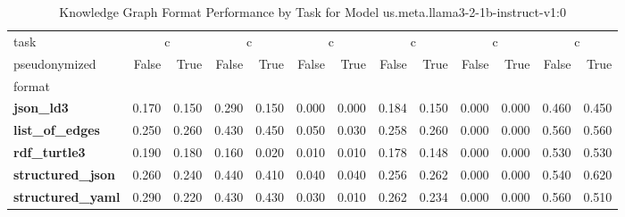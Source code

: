 \begin{table}
\caption{Knowledge Graph Format Performance by Task for Model us.meta.llama3-2-1b-instruct-v1:0}
\label{tab:results_us.meta.llama3-2-1b-instruct-v1:0}
\begin{tabular}{lrrrrrrrrrrrr}
\toprule
task & \multicolumn{2}{c}{c}{AggByRelation} & \multicolumn{2}{c}{c}{AggNeighborProperties} & \multicolumn{2}{c}{c}{HighestDegreeNode} & \multicolumn{2}{c}{c}{Overall} & \multicolumn{2}{c}{c}{ShortestPath} & \multicolumn{2}{c}{c}{TripleRetrieval} \\
pseudonymized & False & True & False & True & False & True & False & True & False & True & False & True \\
format &  &  &  &  &  &  &  &  &  &  &  &  \\
\midrule
\textbf{json_ld3} & 0.170 & 0.150 & 0.290 & 0.150 & 0.000 & 0.000 & 0.184 & 0.150 & 0.000 & 0.000 & 0.460 & 0.450 \\
\textbf{list_of_edges} & 0.250 & 0.260 & 0.430 & 0.450 & 0.050 & 0.030 & 0.258 & 0.260 & 0.000 & 0.000 & 0.560 & 0.560 \\
\textbf{rdf_turtle3} & 0.190 & 0.180 & 0.160 & 0.020 & 0.010 & 0.010 & 0.178 & 0.148 & 0.000 & 0.000 & 0.530 & 0.530 \\
\textbf{structured_json} & 0.260 & 0.240 & 0.440 & 0.410 & 0.040 & 0.040 & 0.256 & 0.262 & 0.000 & 0.000 & 0.540 & 0.620 \\
\textbf{structured_yaml} & 0.290 & 0.220 & 0.430 & 0.430 & 0.030 & 0.010 & 0.262 & 0.234 & 0.000 & 0.000 & 0.560 & 0.510 \\
\bottomrule
\end{tabular}
\end{table}
